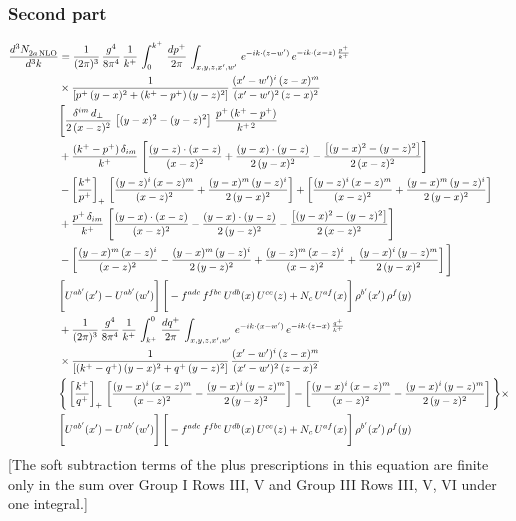 \documentclass[9pt]{article}
\numberwithin{equation}{section}
\begin{document}
\subsubsection*{Second part}
\begin{align}
    \frac{d^{3}N_{2a\,\rm NLO}^{\rm}}{d^{3}k}  & =  \frac{1}{(2\pi)^{3}}\, \frac{g^{4}}{8\pi^{4}}\,\frac{1}{k^{+}}\,\int_{0}^{k^{+}}\, \frac{dp^{+}}{2\pi}\,\int_{x,y,z,x',w'}\, e^{-ik\cdot(z-w')}\,e^{-ik\cdot (x-z)\,\frac{p^{+}}{k^{+}}}\notag \\ & \times\frac{1}{\left[p^{+}\,(y-x)^{2}+(k^{+}-p^{+})\,(y-z)^{2}\right]}\, \frac{(x'-w')^{i}\,(z-x)^{m}}{(x'-w')^{2}\,(z-x)^{2}} \notag \\ & \Bigg[\frac{\delta^{im}\,d_{\perp}}{2\,(x-z)^{2}}\,\left[(y-x)^{2}-(y-z)^{2}\right]\,\frac{p^{+}\,(k^{+}-p^{+})}{k^{+\,2}}\notag \\ & +\frac{(k^{+}-p^{+})\,\delta_{im}}{k^{+}}\,\left[\frac{(y-z)\cdot (x-z)}{(x-z)^{2}}+\frac{(y-x)\cdot (y-z)}{2\,(y-x)^{2}}-\frac{\left[(y-x)^{2}-(y-z)^{2}\right]}{2\,(x-z)^{2}}\right]\notag \\ & -\left[\frac{k^{+}}{p^{+}}\right]_{+}\,\left[\frac{(y-z)^{i}\,(x-z)^{m}}{(x-z)^{2}}+\frac{(y-x)^{m}\,(y-z)^{i}}{2\,(y-x)^{2}}\right]+ \left[\frac{(y-z)^{i}\,(x-z)^{m}}{(x-z)^{2}}+\frac{(y-x)^{m}\,(y-z)^{i}}{2\,(y-x)^{2}}\right]\notag \\ & +\frac{p^{+}\,\delta_{im}}{k^{+}}\,\left[\frac{(y-x)\cdot (x-z)}{(x-z)^{2}}-\frac{(y-x)\cdot (y-z)}{2\,(y-z)^{2}}-\frac{\left[(y-x)^{2}-(y-z)^{2}\right]}{2\,(x-z)^{2}}\right]\notag \\ &-\left[\frac{(y-x)^{m}\,(x-z)^{i}}{(x-z)^{2}}-\frac{(y-x)^{m}\,(y-z)^{i}}{2\,(y-z)^{2}}+\frac{(y-z)^{m}\,(x-z)^{i}}{(x-z)^{2}}+\frac{(y-x)^{i}\,(y-z)^{m}}{2\,(y-x)^{2}}\right]\Bigg] \notag \\ & \Bigg[U^{ab'}(x')-U^{ab'}(w')\Bigg]\,\Bigg[-f^{adc}\,f^{fbe}\,U^{db}(x)\,U^{ce}(z)+N_{c}\,U^{af}(x)\Bigg]\,\rho^{b'}(x')\,\rho^{f}(y)\notag \\ & + \frac{1}{(2\pi)^{3}}\,\frac{g^{4}}{8\pi^{4}}\,\frac{1}{k^{+}}\, \int^{0}_{k^{+}}\, \frac{dq^{+}}{2\pi} \,  \int_{x,y,z,x',w'}\,e^{-ik\cdot(x-w')}\,e^{-ik\cdot (z-x)\,\frac{q^{+}}{k^{+}}}\notag \\ & \times\frac{1}{\left[(k^{+}-q^{+})\,(y-x)^{2}+q^{+}\,(y-z)^{2}\right]}\, \frac{(x'-w')^{i}\,(z-x)^{m}}{(x'-w')^{2}\,(z-x)^{2}} \notag \\ &\Bigg\{\left[\frac{k^{+}}{q^{+}}\right]_{+}\,\left[\frac{(y-x)^{i}\,(x-z)^{m}}{(x-z)^{2}}-\frac{(y-x)^{i}\,(y-z)^{m}}{2\,(y-z)^{2}}\right] -\left[\frac{(y-x)^{i}\,(x-z)^{m}}{(x-z)^{2}}-\frac{(y-x)^{i}\,(y-z)^{m}}{2\,(y-z)^{2}}\right]\Bigg\}\times\,\notag \\ & \Bigg[U^{ab'}(x')-U^{ab'}(w')\Bigg]\,\Bigg[-f^{adc}\,f^{fbe}\,U^{db}(x)\,U^{ce}(z)+N_{c}\,U^{af}(x)\Bigg]\,\rho^{b'}(x')\,\rho^{f}(y)
\end{align} {\color{red}[The soft subtraction terms of the plus prescriptions in this equation are finite only in the sum over Group I Rows III, V and Group III Rows III, V, VI under one integral.]}\par\noindent
\end{document}
